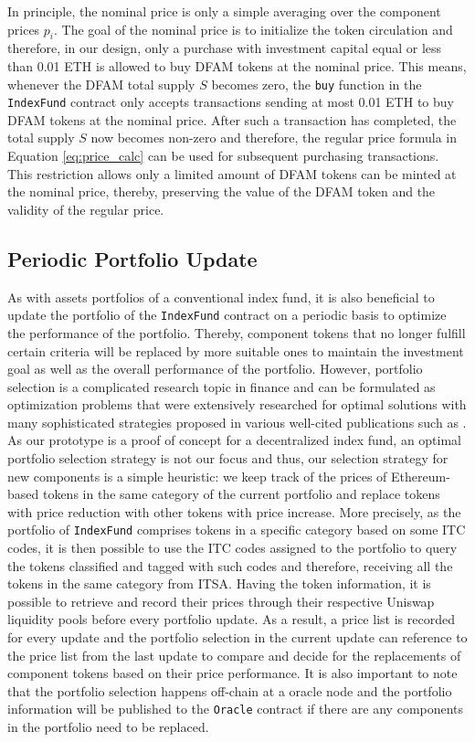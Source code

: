 In principle, the nominal price is only a simple averaging over the component prices $p_i$. The goal of the nominal price is to initialize the token circulation and therefore, in our design, only a purchase with investment capital equal or less than 0.01 ETH is allowed to buy DFAM tokens at the nominal price. This means, whenever the DFAM total supply $S$ becomes zero, the \texttt{buy} function in the \texttt{IndexFund} contract only accepts transactions sending at most 0.01 ETH to buy DFAM tokens at the nominal price. After such a transaction has completed, the total supply $S$ now becomes non-zero and therefore, the regular price formula in Equation \ref{eq:price_calc} can be used for subsequent purchasing transactions. This restriction allows only a limited amount of DFAM tokens can be minted at the nominal price, thereby, preserving the value of the DFAM token and the validity of the regular price.

\subsection{Periodic Portfolio Update} \label{subsec:updateportfolio} 

As with assets portfolios of a conventional index fund, it is also beneficial to update the portfolio of the \texttt{IndexFund} contract on a periodic basis to optimize the performance of the portfolio. Thereby, component tokens that no longer fulfill certain criteria will be replaced by more suitable ones to maintain the investment goal as well as the overall performance of the portfolio. However, portfolio selection is a complicated research topic in finance and can be formulated as optimization problems that were extensively researched for optimal solutions with many sophisticated strategies proposed in various well-cited publications such as \cite{young1998minimax, goldfarb2003robust, li2000optimal}. As our prototype is a proof of concept for a decentralized index fund, an optimal portfolio selection strategy is not our focus and thus, our selection strategy for new components is a simple heuristic: we keep track of the prices of Ethereum-based tokens in the same category of the current portfolio and replace tokens with price reduction with other tokens with price increase. More precisely, as the portfolio of \texttt{IndexFund} comprises tokens in a specific category based on some ITC codes, it is then possible to use the ITC codes assigned to the portfolio to query the tokens classified and tagged with such codes and therefore, receiving all the tokens in the same category from ITSA. Having the token information, it is possible to retrieve and record their prices through their respective Uniswap liquidity pools before every portfolio update. As a result, a price list is recorded for every update and the portfolio selection in the current update can reference to the price list from the last update to compare and decide for the replacements of component tokens based on their price performance. It is also important to note that the portfolio selection happens off-chain at a oracle node and the portfolio information will be published to the \texttt{Oracle} contract if there are any components in the portfolio need to be replaced.

